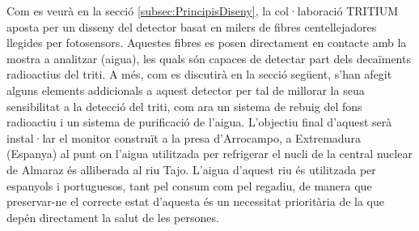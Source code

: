 Com es veurà en la secció \ref{subsec:PrincipisDiseny}, la col·laboració TRITIUM aposta per un disseny del detector basat en milers de fibres centellejadores llegides per fotosensors. Aquestes fibres es posen directament en contacte amb la mostra a analitzar (aigua), les quals són capaces de detectar part dels decaïments radioactius del triti. A més, com es discutirà en la secció següent, s'han afegit alguns elements addicionals a aquest detector per tal de millorar la seua sensibilitat a la detecció del triti, com ara un sistema de rebuig del fons radioactiu i un sistema de purificació de l'aigua. L'objectiu final d'aquest serà instal·lar el monitor construït a la presa d'Arrocampo, a Extremadura (Espanya) al punt on l'aigua utilitzada per refrigerar el nucli de la central nuclear de Almaraz és alliberada al riu Tajo. L'aigua d'aquest riu és utilitzada per espanyols i portuguesos, tant pel consum com pel regadiu, de manera que preservar-ne el correcte estat d'aquesta és un necessitat prioritària de la que depén directament la salut de les persones. 